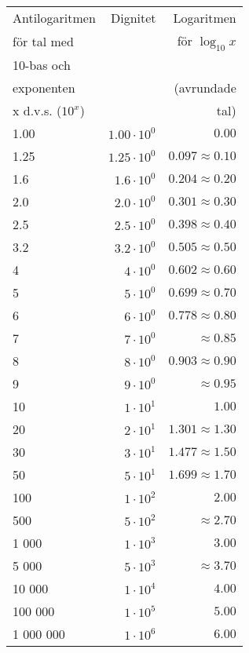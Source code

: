 \begin{tabular}{l|r|r}
Antilogaritmen    & Dignitet & Logaritmen            \\
för tal med       &          & för \(\log_{10} x\)        \\
10-bas och        &          &                       \\
exponenten        &          & (avrundade            \\
x d.v.s. (\(10^x\)) &          & tal)                  \\ \hline
1.00      & \(1.00 \cdot 10^0\) & \(0.00\)               \\
1.25      & \(1.25 \cdot 10^0\) & \(0.097 \approx 0.10\) \\
1.6       & \(1.6 \cdot 10^0\) & \(0.204 \approx 0.20\)  \\
2.0       & \(2.0 \cdot 10^0\) & \(0.301 \approx 0.30\)  \\
2.5       & \(2.5 \cdot 10^0\) & \(0.398 \approx 0.40\)  \\
3.2       & \(3.2 \cdot 10^0\) & \(0.505 \approx 0.50\)  \\
4         & \(4 \cdot 10^0\)   & \(0.602 \approx 0.60\)  \\
5         & \(5 \cdot 10^0\)   & \(0.699 \approx 0.70\)  \\
6         & \(6 \cdot 10^0\)   & \(0.778 \approx 0.80\)  \\
7         & \(7 \cdot 10^0\)   & \(\approx 0.85\)        \\
8         & \(8 \cdot 10^0\)   & \(0.903 \approx 0.90\)  \\
9         & \(9 \cdot 10^0\)   & \(\approx 0.95\)        \\
10        & \(1 \cdot 10^1\)   & \(1.00\)                \\
20        & \(2 \cdot 10^1\)   & \(1.301 \approx 1.30\)  \\
30        & \(3 \cdot 10^1\)   & \(1.477 \approx 1.50\)  \\
50        & \(5 \cdot 10^1\)   & \(1.699 \approx 1.70\)  \\
100       & \(1 \cdot 10^2\)   & \(2.00\)                \\
500       & \(5 \cdot 10^2\)   & \(\approx 2.70\)        \\
1 000     & \(1 \cdot 10^3\)   & \(3.00\)                \\
5 000     & \(5 \cdot 10^3\)   & \(\approx3.70\)         \\
10 000    & \(1 \cdot 10^4\)   & \(4.00\)                \\
100 000   & \(1 \cdot 10^5\)   & \(5.00\)                \\
1 000 000 & \(1 \cdot 10^6\)   & \(6.00\)                \\
\end{tabular}


